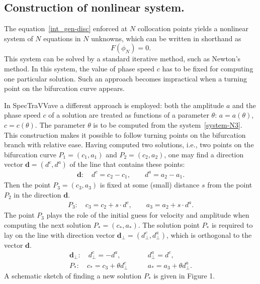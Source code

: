 
\subsection{Construction of nonlinear system.}

%
The equation~\eqref{int_gen-disc} enforced at $N$ collocation points 
yields a nonlinear system of $N$ equations in $N$ unknowns, which can be written in shorthand as  
	\begin{equation*}
		F(\phi_N) = 0.
	\end{equation*}
This system can be solved by a standard iterative method, such as Newton's method. 
	In this system, the value of phase speed $c$ has to be fixed for computing one particular solution. 
	Such an approach becomes impractical when a turning point on the bifurcation curve appears. 
	
	In \textsf{SpecTraVVave} a different approach is employed: both the amplitude $a$ and the phase speed $c$ of a solution are treated as functions of a parameter $\theta$: $ a = a(\theta)$, $c = c(\theta)$. The parameter $\theta$ is to be computed from the system~\eqref{system-N3}. This construction makes it possible to follow turning points
on the bifurcation branch with relative ease.
	Having computed two solutions, i.e., two points on the bifurcation curve $P_1 = (c_1, a_1)$ and $P_2 = (c_2, a_2)$, one may find a direction vector $\mathbf{d}=(d^c, d^a)$ of the line that contains these points:
	\begin{align*}
		\mathbf{d}:	\quad d^c = c_2 - c_1, \qquad	d^a = a_2-a_1.
	\end{align*}
	Then the point $P_3 = (c_3,a_3)$ is fixed at some (small) distance $s$ from the point $P_2$ in the direction $\mathbf{d}$.
	\begin{align*}
		P_3: \quad c_3 = c_2 + s \cdot d^c, \qquad	a_3 = a_2 + s \cdot d^a.
	\end{align*}
	 The point $P_3$ plays the role of the initial guess for velocity and amplitude when computing the next solution $P_\ast = (c_\ast, a_\ast)$. 
	The solution point $P_\ast$ is required to lay on the line with direction vector $\mathbf{d_{\bot}}=(d^c_{\bot}, d^a_{\bot})$, which is orthogonal to the vector $\mathbf{d}$.
	\begin{align*}
	\mathbf{d_{\bot}}: \quad d^c_{\bot} = - d^a, \qquad &d^a_{\bot} = d^c,  \\
	P_\ast: \quad c_\ast = c_3 + \theta d^c_{\bot} \qquad &a_\ast = a_3 + \theta d^a_{\bot}.
	\end{align*}
	 A schematic sketch of finding a new solution $P_\ast$ is given in Figure 1.	
	
